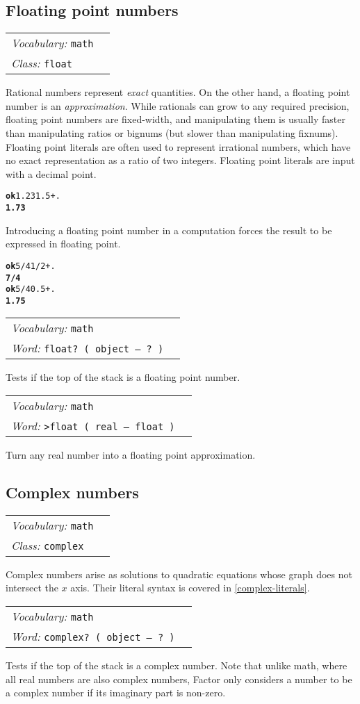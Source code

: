 \documentclass{book}
\newcommand{\vocabulary}[1]{\emph{Vocabulary:} \texttt{#1}&\\}
\newcommand{\ordinaryword}[2]{\index{\texttt{#1}}\emph{Word:} \texttt{#2}&\\}
\newcommand{\classword}[1]{\index{\texttt{#1}}\emph{Class:} \texttt{#1}&\\}
\newcommand{\predword}[1]{\ordinaryword{#1}{#1~( object -- ?~)}}
\newcommand{\wordtable}[1]{


\begin{tabularx}{12cm}{lX}
\hline
#1
\hline
\end{tabularx}

}
\begin{document}
\subsection{\label{floats}Floating point numbers}

\wordtable{
\vocabulary{math}
\classword{float}
}
\newcommand{\realglos}{}
\realglos
\floatglos

Rational numbers represent \emph{exact} quantities. On the other hand, a floating point number is an \emph{approximation}. While rationals can grow to any required precision, floating point numbers are fixed-width, and manipulating them is usually faster than manipulating ratios or bignums (but slower than manipulating fixnums). Floating point literals are often used to represent irrational numbers, which have no exact representation as a ratio of two integers. Floating point literals are input with a decimal point.

\begin{alltt}
\textbf{ok} 1.23 1.5 + .
\textbf{1.73}
\end{alltt}

Introducing a floating point number in a computation forces the result to be expressed in floating point.

\begin{alltt}
\textbf{ok} 5/4 1/2 + .
\textbf{7/4}
\textbf{ok} 5/4 0.5 + .
\textbf{1.75}
\end{alltt}

\wordtable{
\vocabulary{math}
\predword{float?}
}
Tests if the top of the stack is a floating point number.
\wordtable{
\vocabulary{math}
\ordinaryword{>float}{>float ( real -- float )}
}
Turn any real number into a floating point approximation.

\subsection{\label{complex-numbers}Complex numbers}

\wordtable{
\vocabulary{math}
\classword{complex}
}
Complex numbers arise as solutions to quadratic equations whose graph does not intersect the $x$ axis. Their literal syntax is covered in \ref{complex-literals}.

\wordtable{
\vocabulary{math}
\predword{complex?}
}
Tests if the top of the stack is a complex number. Note that unlike math, where all real numbers are also complex numbers, Factor only considers a number to be a complex number if its imaginary part is non-zero.
\end{document}
